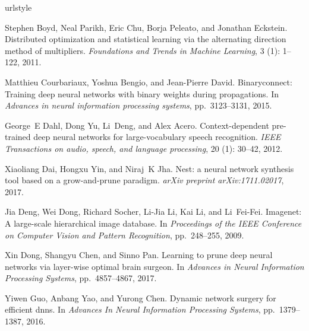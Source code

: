 \documentclass{article} %
\begin{document}
\begin{thebibliography}{36}
\providecommand{\natexlab}[1]{#1}
\providecommand{\url}[1]{\texttt{#1}}
\expandafter\ifx\csname urlstyle\endcsname\relax
  \providecommand{\doi}[1]{doi: #1}\else
  \providecommand{\doi}{doi: \begingroup \urlstyle{rm}\Url}\fi

Stephen Boyd, Neal Parikh, Eric Chu, Borja Peleato, and Jonathan Eckstein.
\newblock Distributed optimization and statistical learning via the alternating
  direction method of multipliers.
\newblock \emph{Foundations and Trends{\textregistered} in Machine Learning},
  3 (1): 1--122, 2011.

Matthieu Courbariaux, Yoshua Bengio, and Jean-Pierre David.
\newblock Binaryconnect: Training deep neural networks with binary weights
  during propagations.
\newblock In \emph{Advances in neural information processing systems}, pp.\  3123--3131, 2015.

George~E Dahl, Dong Yu, Li~Deng, and Alex Acero.
\newblock Context-dependent pre-trained deep neural networks for
  large-vocabulary speech recognition.
\newblock \emph{IEEE Transactions on audio, speech, and language processing},
  20 (1): 30--42, 2012.

Xiaoliang Dai, Hongxu Yin, and Niraj~K Jha.
\newblock Nest: a neural network synthesis tool based on a grow-and-prune
  paradigm.
\newblock \emph{arXiv preprint arXiv:1711.02017}, 2017.

Jia Deng, Wei Dong, Richard Socher, Li-Jia Li, Kai Li, and Li~Fei-Fei.
\newblock Imagenet: A large-scale hierarchical image database.
\newblock In \emph{Proceedings of the IEEE Conference on Computer Vision and
  Pattern Recognition}, pp.\ 248--255, 2009.

Xin Dong, Shangyu Chen, and Sinno Pan.
\newblock Learning to prune deep neural networks via layer-wise optimal brain
  surgeon.
\newblock In \emph{Advances in Neural Information Processing Systems}, pp.\  4857--4867, 2017.

Yiwen Guo, Anbang Yao, and Yurong Chen.
\newblock Dynamic network surgery for efficient dnns.
\newblock In \emph{Advances In Neural Information Processing Systems}, pp.\  1379--1387, 2016.


\end{thebibliography}
\end{document}
